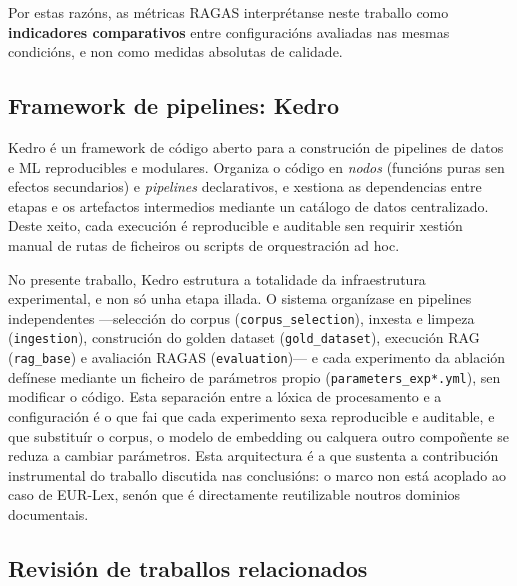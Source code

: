 \documentclass[11pt, a4paper, oneside]{report}
\begin{document}
Por estas razóns, as métricas RAGAS interprétanse neste traballo como \textbf{indicadores
comparativos} entre configuracións avaliadas nas mesmas condicións, e non como medidas
absolutas de calidade.

\subsection{Framework de pipelines: Kedro}
\label{sec:kedro}

Kedro \citep{kedro2023} é un framework de código aberto para a construción de
pipelines de datos e ML reproducibles e modulares. Organiza o código en
\emph{nodos} (funcións puras sen efectos secundarios) e \emph{pipelines}
declarativos, e xestiona as dependencias entre etapas e os artefactos
intermedios mediante un catálogo de datos centralizado. Deste xeito, cada
execución é reproducible e auditable sen requirir xestión manual de rutas de
ficheiros ou scripts de orquestración ad hoc.

No presente traballo, Kedro estrutura a totalidade da infraestrutura experimental, e non
só unha etapa illada. O sistema organízase en pipelines independentes —selección do
corpus (\texttt{corpus\_selection}), inxesta e limpeza (\texttt{ingestion}), construción
do golden dataset (\texttt{gold\_dataset}), execución RAG (\texttt{rag\_base}) e avaliación
RAGAS (\texttt{evaluation})— e cada experimento da ablación defínese mediante un ficheiro
de parámetros propio (\texttt{parameters\_exp*.yml}), sen modificar o código. Esta
separación entre a lóxica de procesamento e a configuración é o que fai que cada
experimento sexa reproducible e auditable, e que substituír o corpus, o modelo de
embedding ou calquera outro compoñente se reduza a cambiar parámetros. Esta arquitectura é
a que sustenta a contribución instrumental do traballo discutida nas conclusións: o marco
non está acoplado ao caso de EUR-Lex, senón que é directamente reutilizable noutros
dominios documentais.

\subsection{Revisión de traballos relacionados}
\label{sec:relacionados}
\end{document}
